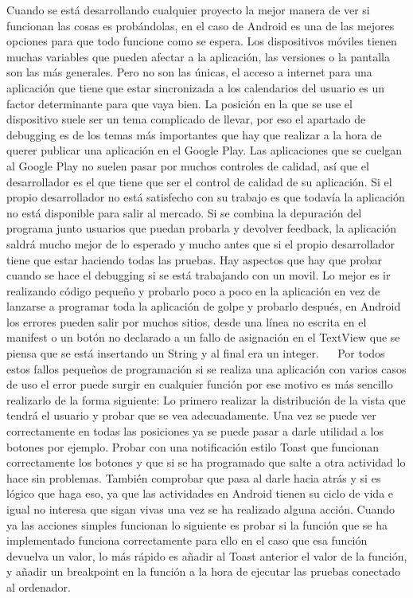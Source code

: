 Cuando se está desarrollando cualquier proyecto la mejor manera de ver si funcionan las cosas es probándolas, en el caso de Android es una de las mejores opciones para que todo funcione como se espera.
Los dispositivos móviles tienen muchas variables que pueden afectar a la aplicación, las versiones o la pantalla son las más generales. Pero no son las únicas, el acceso a internet para una aplicación que tiene que estar sincronizada a los calendarios del usuario es un factor determinante para que vaya bien. La posición en la que se use el dispositivo suele ser un tema complicado de llevar, por eso el apartado de debugging es de los temas más importantes que hay que realizar a la hora de querer publicar una aplicación en el Google Play.
Las aplicaciones que se cuelgan al Google Play no suelen pasar por muchos controles de calidad, así que el desarrollador es el que tiene que ser el control de calidad de su aplicación. Si el propio desarrollador no está satisfecho con su trabajo es que todavía la aplicación no está disponible para salir al mercado.
Si se combina la depuración del programa junto usuarios que puedan probarla y devolver feedback, la aplicación saldrá mucho mejor de lo esperado y mucho antes que si el propio desarrollador tiene que estar haciendo todas las pruebas. 
Hay aspectos que hay que probar cuando se hace el debugging si se está trabajando con un movil. Lo mejor es ir realizando código pequeño y probarlo poco a poco en la aplicación en vez de lanzarse a programar toda la aplicación de golpe y probarlo después, en Android los errores pueden salir por muchos sitios, desde una línea no escrita en el manifest o un botón no declarado a un fallo de asignación en el TextView que se piensa que se está insertando un String y al final era un integer.
 
Por todos estos fallos pequeños de programación si se realiza una aplicación con varios casos de uso el error puede surgir en cualquier función por ese motivo es más sencillo realizarlo de la forma siguiente:
Lo primero realizar la distribución de la vista que tendrá el usuario y probar que se vea adecuadamente.
Una vez se puede ver correctamente en todas las posiciones ya se puede pasar a darle utilidad a los botones por ejemplo. Probar con una notificación estilo Toast que funcionan correctamente los botones y que si se ha programado que salte a otra actividad lo hace sin problemas. También comprobar que pasa al darle hacia atrás y si es lógico que haga eso, ya que las actividades en Android tienen su ciclo de vida e igual no interesa que sigan vivas una vez se ha realizado alguna acción.
Cuando ya las acciones simples funcionan lo siguiente es probar si la función que se ha implementado funciona correctamente para ello en el caso que esa función devuelva  un valor, lo más rápido es añadir al Toast anterior el valor de la función, y añadir un breakpoint en la función a la hora de ejecutar las pruebas conectado al ordenador.
